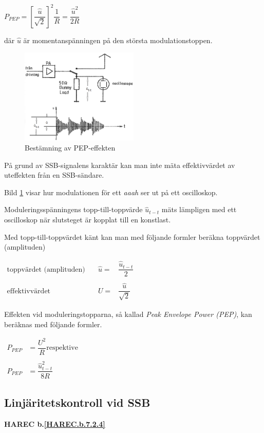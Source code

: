\(P_{PEP} = \left[\dfrac{\hat{u}}{\sqrt{2}}\right]^2\dfrac{1}{R} =  \dfrac{\hat{u}^2}{2R}\)

där \(\hat{u}\) är momentanspänningen på den största modulationstoppen.

\begin{figure}
  \includegraphics[width=0.5\textwidth]{images/cropped_pdfs/bild_2_3-52.pdf}
  \caption{Bestämning av PEP-effekten}
  \label{fig:BildII3-52}
\end{figure}

På grund av SSB-signalens karaktär kan man inte mäta effektivvärdet av
uteffekten från en SSB-sändare.

Bild \ref{fig:BildII3-52} visar hur modulationen för ett \emph{aaah} ser ut
på ett oscilloskop.

Moduleringsspänningens topp-till-topp\-värde \(\hat{u}_{t-t}\) mäts lämpligen med ett
oscilloskop när slutsteget är kopplat till en konstlast.

Med topp-till-toppvärdet känt kan man med följande formler beräkna
toppvärdet (amplituden)

\(
\begin{array}{lll}
\text{toppvärdet (amplituden)} &  \quad \hat{u}= & \dfrac{\hat{u}_{t-t}}{2}\\
& & \\
\text{effektivvärdet} &\quad  U =& \dfrac{\hat{u}}{\sqrt{2}}
\end{array}
\)

Effekten vid moduleringstopparna, så kallad \emph{Peak Envelope Power (PEP)},
kan beräknas med följande formler.

\(
\begin{array}{ll}
P_{PEP} & = \dfrac{U^2}{R} \text{respektive} \\
&\\
P_{PEP} & = \dfrac{\hat{u}_{t-t}^2}{8R}
\end{array}
\)

\subsection{Linjäritetskontroll vid SSB}
\textbf{HAREC
  b.\ref{HAREC.b.7.2.4}\label{myHAREC.b.7.2.4}
}

